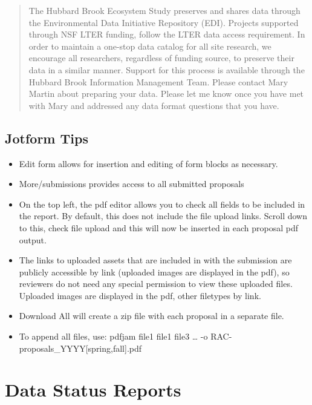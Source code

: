 \documentclass[
  letterpaper,
  DIV=11,
  numbers=noendperiod]{scrreprt}
\begin{document}
\begin{quote}
The Hubbard Brook Ecosystem Study preserves and shares data through the
Environmental Data Initiative Repository (EDI). Projects supported
through NSF LTER funding, follow the LTER data access requirement. In
order to maintain a one-stop data catalog for all site research, we
encourage all researchers, regardless of funding source, to preserve
their data in a similar manner. Support for this process is available
through the Hubbard Brook Information Management Team. Please contact
Mary Martin about preparing your data. Please let me know once you have
met with Mary and addressed any data format questions that you have.
\end{quote}

\section{Jotform Tips}\label{jotform-tips}

\begin{itemize}
\item
  Edit form allows for insertion and editing of form blocks as
  necessary.
\item
  More/submissions provides access to all submitted proposals
\item
  On the top left, the pdf editor allows you to check all fields to be
  included in the report. By default, this does not include the file
  upload links. Scroll down to this, check file upload and this will now
  be inserted in each proposal pdf output.
\item
  The links to uploaded assets that are included in with the submission
  are publicly accessible by link (uploaded images are displayed in the
  pdf), so reviewers do not need any special permission to view these
  uploaded files. Uploaded images are displayed in the pdf, other
  filetypes by link.
\item
  Download All will create a zip file with each proposal in a separate
  file.
\item
  To append all files, use: pdfjam file1 file1 file3 \ldots{} -o
  RAC-proposals\_YYYY{[}spring,fall{]}.pdf
\end{itemize}


\chapter{Data Status Reports}\label{data-status-reports}
\end{document}
